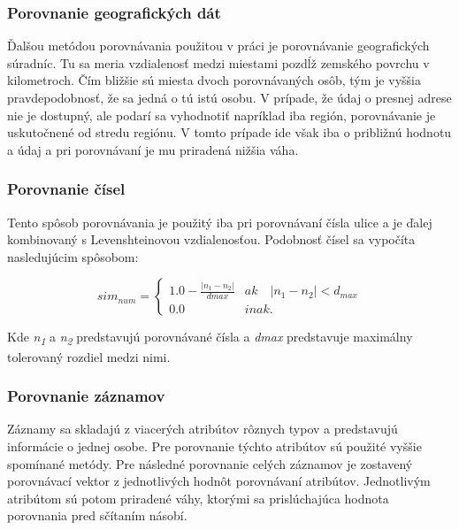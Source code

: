 \subsubsection{Porovnanie geografických dát}
Ďalšou metódou porovnávania použitou v práci je porovnávanie geografických súradníc. Tu
sa meria vzdialenosť medzi miestami pozdĺž zemského povrchu v kilometroch. Čím bližšie sú
miesta dvoch porovnávaných osôb, tým je vyššia pravdepodobnosť, že sa jedná o tú istú
osobu. V prípade, že údaj o presnej adrese nie je dostupný, ale podarí sa vyhodnotiť
napríklad iba región, porovnávanie je uskutočnené od stredu regiónu. V tomto prípade ide
však iba o približnú hodnotu a údaj a pri porovnávaní je mu priradená nižšia váha.

\subsubsection{Porovnanie čísel}
Tento spôsob porovnávania je použitý iba pri porovnávaní čísla ulice a je ďalej kombinovaný
s Levenshteinovou vzdialenosťou. Podobnosť čísel sa vypočíta nasledujúcim spôsobom:

\begin{equation*}
    sim_{num} = 
\begin{cases} 1.0 -  \frac{ |n_1 - n_2|}{ d{max}} &  ak \quad |n_1 - n_2| < d_{max} \\
              0.0  &  inak. \end{cases}
\end{equation*}

Kde \textit{n\textsubscript{1}} a \textit{n\textsubscript{2}} predstavujú porovnávané čísla a \textit{dmax} predstavuje maximálny tolerovaný
rozdiel medzi nimi.

\subsubsection{Porovnanie záznamov}
Záznamy sa skladajú z viacerých atribútov rôznych typov a predstavujú informácie o jednej
osobe. Pre porovnanie týchto atribútov sú použité vyššie spomínané metódy. Pre následné
porovnanie celých záznamov je zostavený porovnávací vektor z jednotlivých hodnôt
porovnávaní atribútov. Jednotlivým atribútom sú potom priradené váhy, ktorými sa
prislúchajúca hodnota porovnania pred sčítaním násobí.

